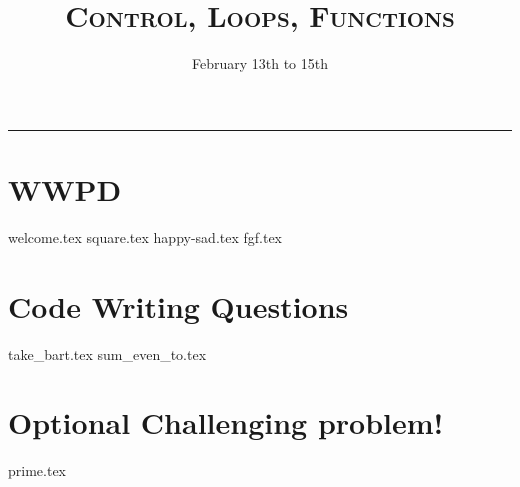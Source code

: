 \documentclass{exam}
\title{\textsc{Control, Loops, Functions}}
\date{February 13th to 15th}
\begin{document}
\maketitle
\rule{\textwidth}{0.15em}
\fontsize{12}{15}\selectfont


\section{WWPD}
\begin{questions}
{welcome.tex}
\vspace{5em}
{square.tex}
\newpage
{happy-sad.tex}
\vspace{5em}
{fgf.tex}
\end{questions}

\newpage
\section{Code Writing Questions}
\begin{questions}
{take_bart.tex}
{sum_even_to.tex}
\newpage
\section{Optional Challenging problem!}
{prime.tex}

\end{questions}
\end{document}
